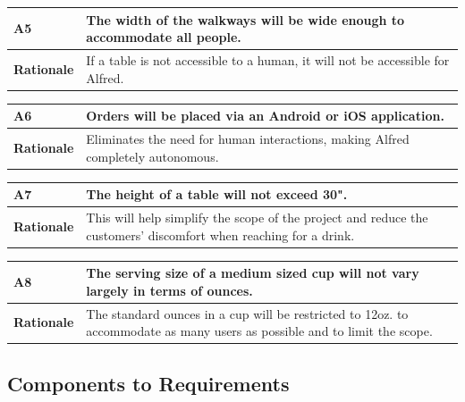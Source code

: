 \documentclass [10pt]{article}
\begin{document}
\begin{longtable}{| p{ } | p{ } | }\hline 
\rowcolor{tableCell}\textbf{A5} & The width of the walkways will be wide enough to accommodate all people. \\ \hline
\textbf{Rationale} &  If a table is not accessible to a human, it will not be accessible for Alfred.\\ \hline
\end{longtable}

\begin{longtable}{| p{ } | p{ } | }\hline 
\rowcolor{tableCell}\textbf{A6} & Orders will be placed via an Android or iOS application. \\ \hline
\textbf{Rationale} &  Eliminates the need for human interactions, making Alfred completely autonomous. \\ \hline
\end{longtable}

\begin{longtable}{| p{ } | p{ } | }\hline 
\rowcolor{tableCell}\textbf{A7} & The height of a table will not exceed 30". \\ \hline
\textbf{Rationale} &  This will help simplify the scope of the project and reduce the customers' discomfort when reaching for a drink.\\ \hline
\end{longtable}

\begin{longtable}{| p{ } | p{ } | }\hline 
\rowcolor{tableCell}\textbf{A8} & The serving size of a medium sized cup will not vary largely in terms of ounces. \\ \hline
\textbf{Rationale} &  The standard ounces in a cup will be restricted to 12oz. to accommodate as many users as possible and to limit the scope. \\ \hline
\end{longtable}


\subsection{Components to Requirements}
\end{document}
